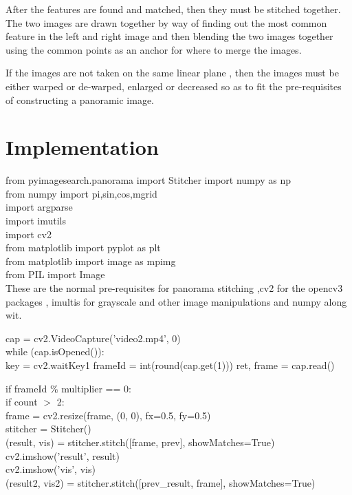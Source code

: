 \documentclass{article}
\begin{document}
After the features are found and matched, then they must be stitched together. The two images are drawn together by way of finding out the most common feature in the left and right image and then blending the two images together using the common points as an anchor for where to merge the images.


If the images are not taken on the same linear plane , then the images must be either warped or de-warped, enlarged or decreased so as to fit the pre-requisites of constructing a panoramic image.
\pagebreak
\section{Implementation}\label{sec:overview}
from pyimagesearch.panorama import Stitcher
import numpy as np\\
from numpy import pi,sin,cos,mgrid\\
import argparse\\
import imutils\\
import cv2\\

from matplotlib import pyplot as plt\\
from matplotlib import image as mpimg\\
from PIL import Image\\


These are the normal pre-requisites for panorama stitching ,cv2 for the opencv3 packages , imultis for grayscale and other image manipulations and numpy along wit.

cap = cv2.VideoCapture('video2.mp4', 0)\\

while (cap.isOpened()):\\
		key = cv2.waitKey1
frameId = int(round(cap.get(1)))
ret, frame = cap.read()


if frameId \% multiplier == 0:\\
if count $>$ 2:\\
frame = cv2.resize(frame, (0, 0), fx=0.5, fy=0.5)\\

stitcher = Stitcher()\\
(result, vis) = stitcher.stitch([frame, prev], showMatches=True)\\
cv2.imshow('result', result)\\
cv2.imshow('vis', vis)\\

(result2, vis2) = stitcher.stitch([prev\_result, frame], showMatches=True)\\
\end{document}

